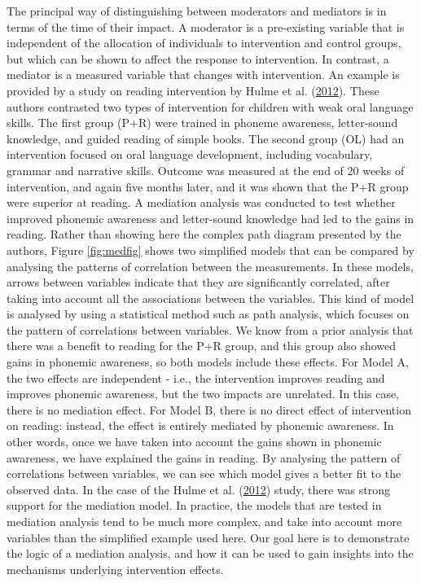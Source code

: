 \documentclass{krantz}
\begin{document}
The principal way of distinguishing between moderators and mediators is in terms of the time of their impact. A moderator is a pre-existing variable that is independent of the allocation of individuals to intervention and control groups, but which can be shown to affect the response to intervention. In contrast, a mediator is a measured variable that changes with intervention. An example is provided by a study on reading intervention by Hulme et al. (\protect\hyperlink{ref-hulme2012}{2012}). These authors contrasted two types of intervention for children with weak oral language skills. The first group (P+R) were trained in phoneme awareness, letter-sound knowledge, and guided reading of simple books. The second group (OL) had an intervention focused on oral language development, including vocabulary, grammar and narrative skills. Outcome was measured at the end of 20 weeks of intervention, and again five months later, and it was shown that the P+R group were superior at reading. A mediation analysis  was conducted to test whether improved phonemic awareness and letter-sound knowledge had led to the gains in reading. Rather than showing here the complex path diagram presented by the authors, Figure \ref{fig:medfig} shows two simplified models that can be compared by analysing the patterns of correlation between the measurements. In these models, arrows between variables indicate that they are significantly correlated, after taking into account all the associations between the variables. This kind of model is analysed by using a statistical method such as path analysis, which focuses on the pattern of correlations between variables. We know from a prior analysis that there was a benefit to reading for the P+R group, and this group also showed gains in phonemic awareness, so both models include these effects. For Model A, the two effects are independent - i.e., the intervention improves reading and improves phonemic awareness, but the two impacts are unrelated. In this case, there is no mediation effect. For Model B, there is no direct effect of intervention on reading: instead, the effect is entirely mediated by phonemic awareness. In other words, once we have taken into account the gains shown in phonemic awareness, we have explained the gains in reading. By analysing the pattern of correlations between variables, we can see which model gives a better fit to the observed data. In the case of the Hulme et al. (\protect\hyperlink{ref-hulme2012}{2012}) study, there was strong support for the mediation model. In practice, the models that are tested in mediation analysis tend to be much more complex, and take into account more variables than the simplified example used here. Our goal here is to demonstrate the logic of a mediation analysis, and how it can be used to gain insights into the mechanisms underlying intervention effects.
\end{document}
